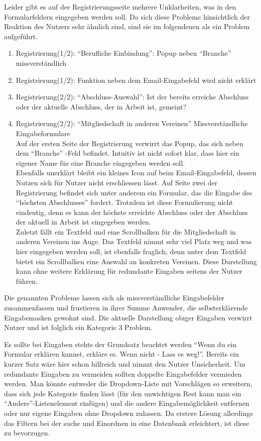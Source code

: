 {
Leider gibt es auf der Registrierungsseite mehrere Unklarheiten, was in den Formularfeldern eingegeben werden soll. Da sich diese Probleme hinsichtlich der Reaktion
des Nutzers sehr ähnlich sind, sind sie im folgendenen als ein Problem aufgeführt.

\begin{enumerate}
	\item {Registrierung(1/2): “Berufliche Einbindung”: Popup neben “Branche” missverständlich}
	\item {Registrierung(1/2): Funktion neben dem Email-Eingabefeld wird nicht erklärt}
	\item {Registrierung(2/2): “Abschluss-Auswahl”: Ist der bereits erreiche Abschluss oder der aktuelle Abschluss, der in Arbeit ist, gemeint? }
	\item {Registrierung(2/2): “Mitgliedschaft in anderen Vereinen” Missverständliche Eingabeformulare}	
\\	
Auf der ersten Seite der Registrierung verwirrt das Popup, das sich neben dem “Branche” -Feld befindet. Intuitiv ist nicht sofort klar, dass hier ein eigener
Name für eine Branche eingegeben werden soll.\\
Ebenfalls unerklärt bleibt ein kleines Icon auf beim Email-Eingabefeld, dessen Nutzen sich für Nutzer nicht erschliessen lässt.
Auf Seite zwei der Registrierung befindet sich unter anderem ein Formular, das die Eingabe des “höchsten Abschlusses” fordert. Trotzdem ist diese Formulierung nicht eindeutig,
denn es kann der höchste erreichte Abschluss oder der Abschluss der aktuell in Arbeit ist eingegeben werden.\\
Zuletzt fällt ein Textfeld und eine Scrollbalken für die Mitgliedschaft in anderen Vereinen ins Auge. Das Textfeld nimmt sehr viel Platz weg und was hier eingegeben werden soll, ist ebenfalls fraglich, denn unter dem Textfeld bietet ein Scrollbalken eine Auswahl an konkreten Vereinen. Diese Darstellung kann ohne weitere Erklärung für redundante Eingaben seitens der Nutzer führen.
	
\end{enumerate}
}
{Die genannten Probleme lassen sich als missverständliche Eingabefelder zusammenfassen und frustieren in ihrer Summe Anwender, die selbsterklärende Eingabemasken gewohnt sind. Die aktuelle Darstellung obiger Eingaben verwirrt Nutzer und ist folglich ein Kategorie 3 Problem.

}
{
Es sollte bei Eingaben stehts der Grundsatz beachtet werden “Wenn du ein Formular erklären kannst, erkläre es. Wenn nicht - Lass es weg!”. Bereits ein kurzer Satz wäre hier schon hilfreich und nimmt den Nutzer Unsicherheit. Um redundante Eingaben zu vermeiden sollten doppelte Eingabefelder vermieden werden. Man könnte entweder die Dropdown-Liste mit Vorschlägen so erweitern, dass sich jede Kategorie finden lässt (für den unwichtigen Rest kann man ein “Andere”-Listenelement einfügen) und die andere Eingabemöglichkeit entfernen oder nur eigene Eingaben ohne Dropdown zulassen. Da erstere Lösung allerdings das Filtern bei der suche und Einordnen in eine Datenbank erleichtert, ist diese zu bevorzugen.
}
  




